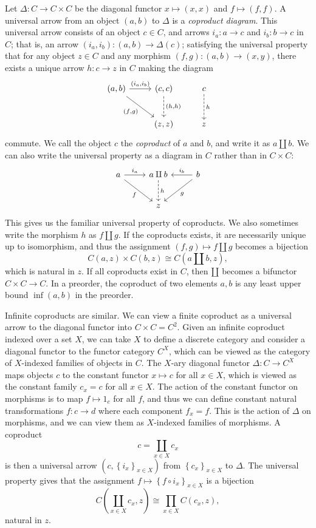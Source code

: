 Let $\Delta : C \to C\times C$ be the diagonal functor $x\mapsto (x,x)$ and $f\mapsto (f,f)$. A universal arrow from an object $(a,b)$ to $\Delta $ is a \emph{coproduct diagram}. This universal arrow consists of an object $c\in C$, and arrows $i_a : a \to c$ and $i_b : b \to c$ in $C$; that is, an arrow $(i_a,i_b): (a,b) \to \Delta (c)$; satisfying the universal property that for any object $z\in C$ and any morphism $(f,g): (a,b) \to (x,y)$, there exists a unique arrow $h : c \to z$ in $C$ making the diagram
\[\begin{tikzcd}[row sep = 2.5em, column sep = 2.5em]
(a,b)\ar[" (i_a\text{,} i_b) ", r] \ar[" (f\text{,} g) "', dr]  & (c,c)\ar[" (h\text{,}h) ", dashed, d]  & c\ar[" h ", dashed, d]  \\
 & (z,z) & z
\end{tikzcd}\]
commute. We call the object $c$ the \emph{coproduct} of $a$ and $b$, and write it as $a\amalg b$. We can also write the universal property as a diagram in $C$ rather than in $C\times C$:
\[\begin{tikzcd}[row sep = 2.5em, column sep = 2.5em]
a\ar[" i_a ", r] \ar[" f "', dr]  & a\amalg b \ar[" h ", dashed, d]  & b \ar[" i_b "', l] \ar[" g ", dl]  \\
 & z & 
\end{tikzcd}\]
This gives us the familiar universal property of coproducts. We also sometimes write the morphism $h$ as $f\amalg g$. If the coproducts exists, it are necessarily unique up to isomorphism, and thus the assignment $(f,g)\mapsto f\amalg g$ becomes a bijection
\[
	C(a,z)\times C(b,z)\cong C(a\amalg b,z),
\]
which is natural in $z$. If all coproducts exist in $C$, then $\amalg$ becomes a bifunctor $C\times C \to C$. In a preorder, the coproduct of two elements $a,b$ is any least upper bound $\inf (a,b)$ in the preorder.

Infinite coproducts are similar. We can view a finite coproduct as a universal arrow to the diagonal functor into $C\times C=C^2$. Given an infinite coproduct indexed over a set $X$, we can take $X$ to define a discrete category and consider a diagonal functor to the functor category $C^X$, which can be viewed as the category of $X$-indexed families of objects in $C$. The $X$-ary diagonal functor $\Delta : C \to C^X$ maps objects $c$ to the constant functor $x\mapsto c$ for all $x\in X$, which is viewed as the constant family $c_x=c$ for all $x\in X$. The action of the constant functor on morphisms is to map $f\mapsto 1_c$ for all $f$, and thus we can define constant natural transformations $f : c \to d$ where each component $f_x=f$. This is the action of $\Delta $ on morphisms, and we can view them as $X$-indexed families of morphisms. A coproduct
\[
	c=\coprod_{x\in X}c_x
\]
is then a universal arrow $(c,\left\{ i_x \right\}_{x\in X} )$ from $\left\{ c_x \right\} _{x\in X} $ to $\Delta $. The universal property gives that the assignment $f\mapsto \left\{ f\circ i_x \right\}_{x\in X} $ is a bijection
\[
	C\left( \coprod_{x\in X}c_x,z \right) \cong \prod_{x\in X} C\left( c_x,z \right) ,
\]
natural in $z$.

